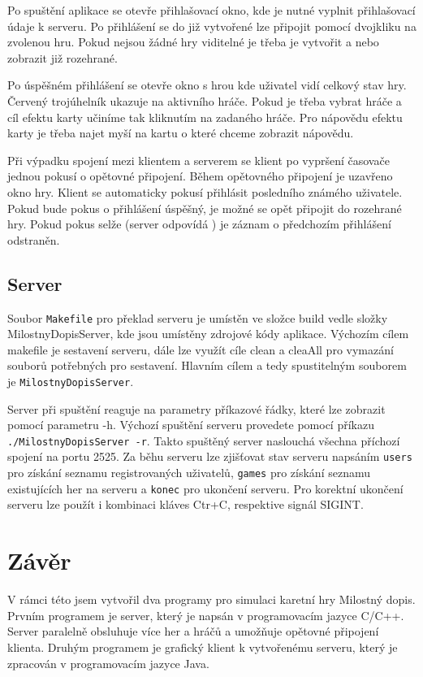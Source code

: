 \documentclass[12pt, a4paper]{article}
\begin{document}
Po spuštění aplikace se otevře přihlašovací okno, kde je nutné vyplnit přihlašovací údaje k serveru. Po přihlášení se do již vytvořené lze připojit pomocí dvojkliku na zvolenou hru. Pokud nejsou žádné hry viditelné je třeba je vytvořit a nebo zobrazit již rozehrané.

Po úspěšném přihlášení se otevře okno s hrou kde uživatel vidí celkový stav hry. Červený trojúhelník ukazuje na aktivního hráče. Pokud je třeba vybrat hráče a cíl efektu karty učiníme tak kliknutím na zadaného hráče. Pro nápovědu efektu karty je třeba najet myší na kartu o které chceme zobrazit nápovědu.

Při výpadku spojení mezi klientem a serverem se klient po vypršení časovače jednou pokusí o opětovné připojení. Během opětovného připojení je uzavřeno okno hry. Klient se automaticky pokusí přihlásit posledního známého uživatele. Pokud bude pokus o přihlášení úspěšný, je možné se opět připojit do rozehrané hry. Pokud pokus selže (server odpovídá ) je záznam o předchozím přihlášení odstraněn.

\subsection{Server}

Soubor \texttt{Makefile} pro překlad serveru je umístěn ve složce build vedle složky MilostnyDopisServer, kde jsou umístěny zdrojové kódy aplikace. Výchozím cílem makefile je sestavení serveru, dále lze využít cíle clean a cleaAll pro vymazání souborů potřebných pro sestavení. Hlavním cílem a tedy spustitelným souborem je \texttt{MilostnyDopisServer}.

Server při spuštění reaguje na parametry příkazové řádky, které lze zobrazit pomocí parametru -h. Výchozí spuštění serveru provedete pomocí příkazu \texttt{./MilostnyDopisServer -r}. Takto spuštěný server naslouchá všechna příchozí spojení na portu 2525. Za běhu serveru lze zjišťovat stav serveru napsáním \texttt{users} pro získání seznamu registrovaných uživatelů, \texttt{games} pro získání seznamu existujících her na serveru a \texttt{konec} pro ukončení serveru. Pro korektní ukončení serveru lze použít i kombinaci kláves Ctr+C, respektive signál SIGINT. 

\newpage
\section{Závěr}  %
V rámci této jsem vytvořil dva programy pro simulaci karetní hry Milostný dopis. Prvním programem je server, který je napsán v programovacím jazyce C/C++. Server paralelně obsluhuje více her a hráčů a umožňuje opětovné připojení klienta. Druhým programem je grafický klient k vytvořenému serveru, který je zpracován v programovacím jazyce Java.
\end{document}
